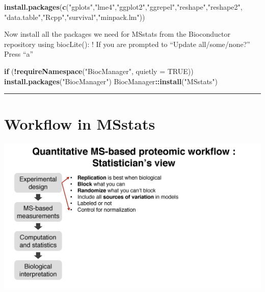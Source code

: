 \documentclass[]{book}
\newenvironment{Shaded}{\begin{snugshade}}{\end{snugshade}}
\newcommand{\ControlFlowTok}[1]{\textcolor[rgb]{0.13,0.29,0.53}{\textbf{#1}}}
\newcommand{\DataTypeTok}[1]{\textcolor[rgb]{0.13,0.29,0.53}{#1}}
\newcommand{\KeywordTok}[1]{\textcolor[rgb]{0.13,0.29,0.53}{\textbf{#1}}}
\newcommand{\NormalTok}[1]{#1}
\newcommand{\OperatorTok}[1]{\textcolor[rgb]{0.81,0.36,0.00}{\textbf{#1}}}
\newcommand{\OtherTok}[1]{\textcolor[rgb]{0.56,0.35,0.01}{#1}}
\newcommand{\StringTok}[1]{\textcolor[rgb]{0.31,0.60,0.02}{#1}}
\begin{document}
\begin{Shaded}
\begin{Highlighting}[]
\KeywordTok{install.packages}\NormalTok{(}\KeywordTok{c}\NormalTok{(}\StringTok{"gplots"}\NormalTok{,}\StringTok{"lme4"}\NormalTok{,}\StringTok{"ggplot2"}\NormalTok{,}\StringTok{"ggrepel"}\NormalTok{,}\StringTok{"reshape"}\NormalTok{,}\StringTok{"reshape2"}\NormalTok{, }\StringTok{"data.table"}\NormalTok{,}\StringTok{"Rcpp"}\NormalTok{,}\StringTok{"survival"}\NormalTok{,}\StringTok{"minpack.lm"}\NormalTok{))}
\end{Highlighting}
\end{Shaded}

Now install all the packages we need for MSstats from the Bioconductor repository using biocLite(): ! If you are prompted to ``Update all/some/none?'' Press ``a''

\begin{Shaded}
\begin{Highlighting}[]
\ControlFlowTok{if}\NormalTok{ (}\OperatorTok{!}\KeywordTok{requireNamespace}\NormalTok{(}\StringTok{"BiocManager"}\NormalTok{, }\DataTypeTok{quietly =} \OtherTok{TRUE}\NormalTok{))}
    \KeywordTok{install.packages}\NormalTok{(}\StringTok{"BiocManager"}\NormalTok{)}
\NormalTok{BiocManager}\OperatorTok{::}\KeywordTok{install}\NormalTok{(}\StringTok{"MSstats"}\NormalTok{)}
\end{Highlighting}
\end{Shaded}

\begin{center}\rule{0.5\linewidth}{\linethickness}\end{center}

\hypertarget{workflow-in-msstats}{%
\chapter{Workflow in MSstats}\label{workflow-in-msstats}}

\includegraphics{img/MSstats_intro1.png}
\end{document}
